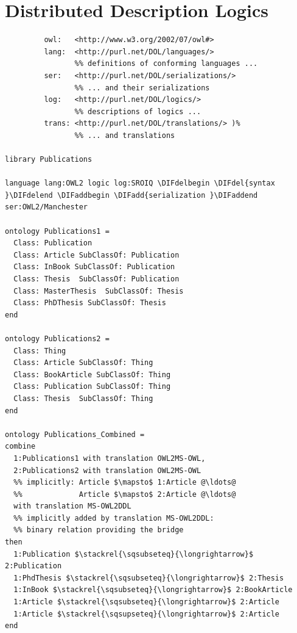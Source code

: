\documentclass[10pt,fleqn,final]{scrreprt}
\newcommand{\sclause}[1]{\section{#1}}
\providecommand{\DIFadd}[1]{{\protect\color{blue}\uwave{#1}}} %
\providecommand{\DIFdel}[1]{{\protect\color{red}\sout{#1}}}                      %
\providecommand{\DIFaddbegin}{} %
\providecommand{\DIFaddend}{} %
\providecommand{\DIFdelbegin}{} %
\providecommand{\DIFdelend}{} %
\begin{document}
\sclause{Distributed Description Logics}\DIFaddbegin \label{ex:DDL}
\DIFaddend 

\DIFdelbegin %
\DIFdelend \DIFaddbegin \begin{lstlisting}[basicstyle=\ttfamily,language=dolText,alsolanguage=OWL2manchester,escapechar=@,mathescape]
\DIFaddend %prefix( :      <http://www.example.org/mereology#>
         owl:   <http://www.w3.org/2002/07/owl#>
         lang:  <http://purl.net/DOL/languages/>
                %% definitions of conforming languages ...
         ser:   <http://purl.net/DOL/serializations/>
                %% ... and their serializations
         log:   <http://purl.net/DOL/logics/>
                %% descriptions of logics ...
         trans: <http://purl.net/DOL/translations/> )%
                %% ... and translations

library Publications

language lang:OWL2 logic log:SROIQ \DIFdelbegin \DIFdel{syntax }\DIFdelend \DIFaddbegin \DIFadd{serialization }\DIFaddend ser:OWL2/Manchester

ontology Publications1 =
  Class: Publication
  Class: Article SubClassOf: Publication
  Class: InBook SubClassOf: Publication
  Class: Thesis  SubClassOf: Publication
  Class: MasterThesis  SubClassOf: Thesis
  Class: PhDThesis SubClassOf: Thesis
end

ontology Publications2 =
  Class: Thing
  Class: Article SubClassOf: Thing
  Class: BookArticle SubClassOf: Thing
  Class: Publication SubClassOf: Thing
  Class: Thesis  SubClassOf: Thing
end

ontology Publications_Combined =
combine
  1:Publications1 with translation OWL2MS-OWL,
  2:Publications2 with translation OWL2MS-OWL
  %% implicitly: Article $\mapsto$ 1:Article @\ldots@
  %%             Article $\mapsto$ 2:Article @\ldots@  
  with translation MS-OWL2DDL
  %% implicitly added by translation MS-OWL2DDL: 
  %% binary relation providing the bridge
then
  1:Publication $\stackrel{\sqsubseteq}{\longrightarrow}$ 2:Publication
  1:PhdThesis $\stackrel{\sqsubseteq}{\longrightarrow}$ 2:Thesis
  1:InBook $\stackrel{\sqsubseteq}{\longrightarrow}$ 2:BookArticle
  1:Article $\stackrel{\sqsubseteq}{\longrightarrow}$ 2:Article
  1:Article $\stackrel{\sqsupseteq}{\longrightarrow}$ 2:Article
end



\end{lstlisting}
\end{document}

